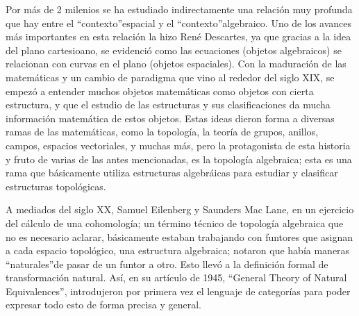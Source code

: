 \documentclass{comunicaciones}
\begin{document}
\noindent 

Por más de 2 milenios se ha estudiado indirectamente una relación muy profunda que hay entre el \textquotedblleft contexto\textquotedblright  espacial y el \textquotedblleft contexto\textquotedblright  algebraico. Uno de los avances más importantes en esta relación la hizo René Descartes, ya que gracias a la
idea del plano cartesioano, se evidenció como las ecuaciones (objetos algebraicos) se relacionan con curvas en el plano (objetos espaciales). Con la maduración de las matemáticas y un cambio de paradigma que vino al rededor del siglo XIX, se empezó a entender muchos objetos matemáticas como objetos con cierta estructura, y que el estudio de las estructuras y sus clasificaciones da mucha información matemática de estos objetos. Estas ideas dieron forma a diversas ramas de las matemáticas, como la topología, la teoría de grupos, anillos, campos, espacios vectoriales, y muchas más, pero la protagonista de esta historia y fruto de varias de las antes mencionadas, es la topología algebraica; esta es una rama que básicamente utiliza estructuras algebráicas para estudiar y clasificar estructuras topológicas. 

A mediados del siglo XX, Samuel Eilenberg y Saunders Mac Lane, en un ejercicio del cálculo de una cohomología; un término técnico de topología algebraica que no es necesario aclarar, básicamente estaban trabajando con funtores que asignan a cada espacio topológico, una estructura algebraica; notaron que había maneras \textquotedblleft naturales\textquotedblright  de pasar de un funtor a otro. Esto llevó a la definición formal de transformación natural. Así, en su artículo de 1945, “General Theory of Natural Equivalences”, introdujeron por primera vez el lenguaje de categorías para poder expresar todo esto de forma precisa y general.
\end{document}
